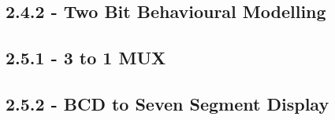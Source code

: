 \documentclass[a4paper, 12pt]{article}
\begin{document}
		\subsection{2.4.2 - Two Bit Behavioural Modelling}
			
		\subsection{2.5.1 - 3 to 1 MUX}
			
		\subsection{2.5.2 - BCD to Seven Segment Display}
			


\end{document}
